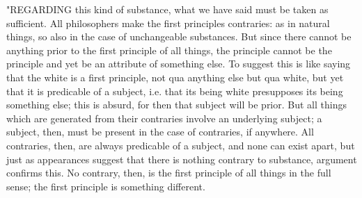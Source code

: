 "REGARDING this kind of substance, what we have said must be taken
as sufficient. All philosophers make the first principles contraries:
as in natural things, so also in the case of unchangeable substances.
But since there cannot be anything prior to the first principle of
all things, the principle cannot be the principle and yet be an attribute
of something else. To suggest this is like saying that the white is
a first principle, not qua anything else but qua white, but yet that
it is predicable of a subject, i.e. that its being white presupposes
its being something else; this is absurd, for then that subject will
be prior. But all things which are generated from their contraries
involve an underlying subject; a subject, then, must be present in
the case of contraries, if anywhere. All contraries, then, are always
predicable of a subject, and none can exist apart, but just as appearances
suggest that there is nothing contrary to substance, argument confirms
this. No contrary, then, is the first principle of all things in the
full sense; the first principle is something different. 

